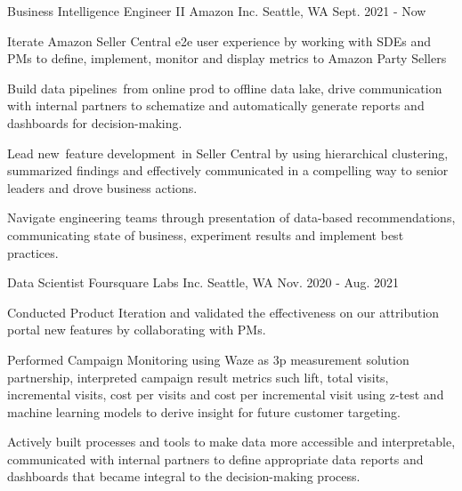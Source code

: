 



\begin{cventries}


\cventry
{Business Intelligence Engineer II} %
{Amazon Inc.} %
{Seattle, WA} %
{Sept. 2021 - Now} %
{
\begin{cvitems}
	\item{Iterate Amazon Seller Central e2e user experience by working with SDEs and PMs to define, implement, monitor and display metrics to Amazon  Party Sellers}
	\item{Build data pipelines from online prod to offline data lake, drive communication with internal partners to schematize and automatically generate reports and dashboards for decision-making.}
	\item{Lead new feature development in Seller Central by using hierarchical clustering, summarized findings and effectively communicated in a compelling way to senior leaders and drove business actions.} 
	\item{Navigate engineering teams through presentation of data-based recommendations, communicating state of business, experiment results and implement best practices.}	
\end{cvitems}
}


\cventry
{Data Scientist} %
{Foursquare Labs Inc.} %
{Seattle, WA} %
{Nov. 2020 - Aug. 2021} %
{
\begin{cvitems}
	\item{Conducted Product Iteration and validated the effectiveness on our attribution portal new features by collaborating with PMs.}
	\item{Performed Campaign Monitoring using Waze as 3p measurement solution partnership, interpreted campaign result metrics such lift, total visits, incremental visits, cost per visits and cost per incremental visit using z-test and machine learning models to derive insight for future customer targeting.}
	\item{Actively built processes and tools to make data more accessible and interpretable, communicated with internal partners to define appropriate data reports and dashboards that became integral to the decision-making process.}		
\end{cvitems}
}


\end{cventries}
